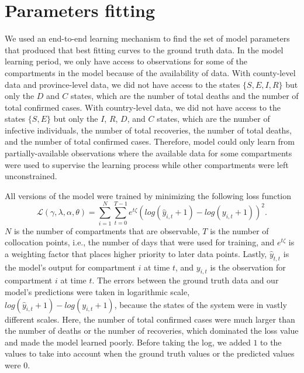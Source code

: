 \section{Parameters fitting}
\label{sec:methodologies-parameters-fitting}

We used an end-to-end learning mechanism to find the set of model parameters that produced that best fitting curves to the ground truth data.
In the model learning period, we only have access to observations for some of the compartments in the model because of the availability of data.
With county-level data and province-level data, we did not have access to the states $\{S, E, I, R\}$ but only the $D$ and $C$ states, which are the number of total deaths and the number of total confirmed cases.
With country-level data, we did not have access to the states $\{S, E\}$ but only the $I$, $R$, $D$, and $C$ states, which are the number of infective individuals, the number of total recoveries, the number of total deaths, and the number of total confirmed cases.
Therefore, model could only learn from partially-available observations where the available data for some compartments were used to supervise the learning process while other compartments were left unconstrained.

All versions of the model were trained by minimizing the following loss function
\begin{equation}
    \mathcal{L}(\gamma, \lambda, \alpha, \theta) = \sum_{i=1}^N \sum_{t=0}^{T-1} e^{t\zeta} (log(\hat{y}_{i,t} + 1) - log(y_{i,t} + 1))^2.
    \label{eq:ude-model-loss}
\end{equation}
$N$ is the number of compartments that are observable, $T$ is the number of collocation points, i.e., the number of days that were used for training, and $e^{t\zeta}$ is a weighting factor that places higher priority to later data points.
Lastly, $\hat{y}_{t,t}$ is the model's output for compartment $i$ at time $t$, and $y_{i,t}$ is the observation for compartment $i$ at time $t$.
The errors between the ground truth data and our model's predictions were taken in logarithmic scale, $log(\hat{y}_{i,t} + 1) - log(y_{i,t} + 1)$, because the states of the system were in vastly different scales.
Here, the number of total confirmed cases were much larger than the number of deaths or the number of recoveries, which dominated the loss value and made the model learned poorly.
Before taking the log, we added $1$ to the values to take into account when the ground truth values or the predicted values were $0$.

